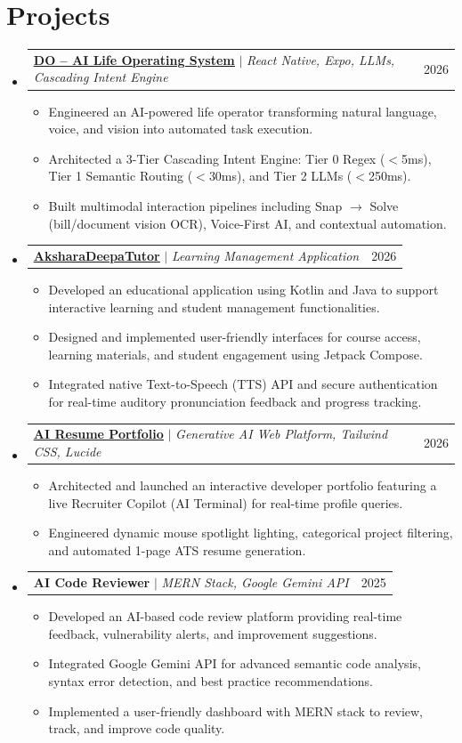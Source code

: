 \documentclass[letterpaper,10.5pt]{article}
\makeatletter
\newcommand{\resumeItem}[1]{
  \item\small{
    {#1 \vspace{-2.5pt}}
  }
}
\newcommand{\resumeProjectHeading}[2]{
    \item
    \begin{tabular*}{0.97\textwidth}{l@{\extracolsep{\fill}}r}
      \small#1 & #2 \\
    \end{tabular*}\vspace{-7pt}
}
\newcommand{\resumeSubHeadingListStart}{\begin{itemize}[leftmargin=0.15in, label={}]}
\newcommand{\resumeSubHeadingListEnd}{\end{itemize}}
\newcommand{\resumeItemListStart}{\begin{itemize}}
\newcommand{\resumeItemListEnd}{\end{itemize}\vspace{-6pt}}
\makeatother
\begin{document}
\section{Projects}
    \resumeSubHeadingListStart
      \resumeProjectHeading
          {\href{https://akshayrbhat-2004.github.io/do-app/}{\textbf{\color{linkblue}\underline{DO -- AI Life Operating System}}} $|$ \emph{React Native, Expo, LLMs, Cascading Intent Engine}}{2026}
          \resumeItemListStart
            \resumeItem{Engineered an AI-powered life operator transforming natural language, voice, and vision into automated task execution.}
            \resumeItem{Architected a 3-Tier Cascading Intent Engine: Tier 0 Regex ($<$5ms), Tier 1 Semantic Routing ($<$30ms), and Tier 2 LLMs ($<$250ms).}
            \resumeItem{Built multimodal interaction pipelines including Snap $\rightarrow$ Solve (bill/document vision OCR), Voice-First AI, and contextual automation.}
          \resumeItemListEnd

      \resumeProjectHeading
          {\href{https://github.com/AKSHAYRBHAT-2004/AksharaDeepaTutor}{\textbf{\color{linkblue}\underline{AksharaDeepaTutor}}} $|$ \emph{Learning Management Application}}{2026}
          \resumeItemListStart
            \resumeItem{Developed an educational application using Kotlin and Java to support interactive learning and student management functionalities.}
            \resumeItem{Designed and implemented user-friendly interfaces for course access, learning materials, and student engagement using Jetpack Compose.}
            \resumeItem{Integrated native Text-to-Speech (TTS) API and secure authentication for real-time auditory pronunciation feedback and progress tracking.}
          \resumeItemListEnd

      \resumeProjectHeading
          {\href{https://akshayrbhat-2004.github.io/portfolio/}{\textbf{\color{linkblue}\underline{AI Resume Portfolio}}} $|$ \emph{Generative AI Web Platform, Tailwind CSS, Lucide}}{2026}
          \resumeItemListStart
            \resumeItem{Architected and launched an interactive developer portfolio featuring a live Recruiter Copilot (AI Terminal) for real-time profile queries.}
            \resumeItem{Engineered dynamic mouse spotlight lighting, categorical project filtering, and automated 1-page ATS resume generation.}
          \resumeItemListEnd

      \resumeProjectHeading
          {\textbf{AI Code Reviewer} $|$ \emph{MERN Stack, Google Gemini API}}{2025}
          \resumeItemListStart
            \resumeItem{Developed an AI-based code review platform providing real-time feedback, vulnerability alerts, and improvement suggestions.}
            \resumeItem{Integrated Google Gemini API for advanced semantic code analysis, syntax error detection, and best practice recommendations.}
            \resumeItem{Implemented a user-friendly dashboard with MERN stack to review, track, and improve code quality.}
          \resumeItemListEnd
    \resumeSubHeadingListEnd
\end{document}
